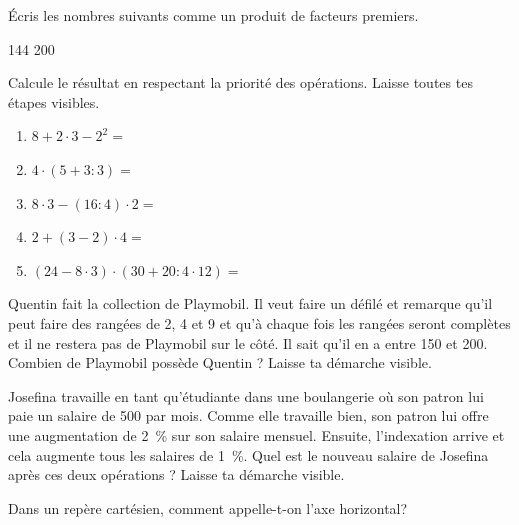 \documentclass[parskip=half-,DIV=12,twoside=semi, 12pt]{scrartcl}
\begin{document}
\begin{appliquer}[points=2]
    Écris les nombres suivants comme un produit de facteurs premiers.

    144 \hfil 200
    \vspace{5cm}
\end{appliquer}
\newpage
\begin{appliquer}[points=10]
    Calcule le résultat en respectant la priorité des opérations. Laisse toutes tes étapes visibles.
    \begin{enumerate}[itemsep=\fill, after=\vfill]
        \item $8+2\cdot 3-2^2=$
        \item $4\cdot \left(5+3:3\right)=$
        \item $8\cdot 3-\left(16:4\right)\cdot 2=$
        \item $2+(3-2)\cdot 4=$
        \item $\left(24-8\cdot 3\right)\cdot\left(30+20:4\cdot 12 \right)=$
    \end{enumerate}
\end{appliquer}
\newpage
\begin{transferer}[points=2]
    Quentin fait la collection de Playmobil. Il veut faire un défilé et remarque qu'il peut
    faire des rangées de 2, 4 et 9 et qu'à chaque fois les rangées seront complètes et
    il ne restera pas de Playmobil sur le côté. Il sait qu'il en a entre 150 et 200. Combien de
    Playmobil possède Quentin ? Laisse ta démarche visible.
\end{transferer}
\vfil
\begin{transferer}[points=3]
    Josefina travaille en tant qu'étudiante dans une boulangerie où son patron lui paie
    un salaire de \SI[]{500}{\sieuro} par mois. Comme elle travaille bien, son patron lui offre une
    augmentation de \SI[]{2}{\%} sur son salaire mensuel. Ensuite, l'indexation arrive et cela
    augmente tous les salaires de \SI[]{1}{\%}. Quel est le nouveau salaire de Josefina après ces deux opérations ? Laisse ta démarche visible.
\end{transferer}
\newpage
\begin{connaitre}[points=1]
    Dans un repère cartésien, comment appelle-t-on l'axe horizontal?\vspace*{1cm}
\end{connaitre}
\end{document}
